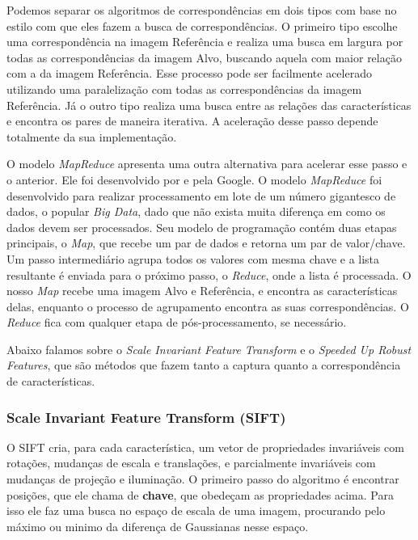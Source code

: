    Podemos separar os algoritmos de correspondências em dois tipos com base no estilo com que eles fazem a busca de 
correspondências. O primeiro tipo escolhe uma correspondência na imagem Referência e realiza uma busca em largura por
todas as correspondências da imagem Alvo, buscando aquela com maior relação com a da imagem Referência. Esse processo
pode ser facilmente acelerado utilizando uma paralelização com todas as correspondências da imagem Referência. Já o 
outro tipo realiza uma busca entre as relações das características e encontra os pares de maneira iterativa. A 
aceleração desse passo depende totalmente da sua implementação.

    O modelo \textit{MapReduce} apresenta uma outra alternativa para acelerar esse passo e o anterior. Ele foi 
desenvolvido por \cite{dean2008mapreduce} e pela Google. O modelo \textit{MapReduce} foi desenvolvido para realizar 
processamento em lote de um número gigantesco de dados, o popular \textit{Big Data}, dado que não exista muita diferença 
em como os dados devem ser processados. Seu modelo de programação contém duas etapas principais, o \textit{Map}, que 
recebe um par de dados e retorna um par de valor/chave. Um passo intermediário agrupa todos os valores com mesma chave e
a lista resultante é enviada para o próximo passo, o \textit{Reduce}, onde a lista é processada. O nosso \textit{Map} 
recebe uma imagem Alvo e Referência, e encontra as características delas, enquanto o processo de agrupamento encontra as
suas correspondências. O \textit{Reduce} fica com qualquer etapa de pós-processamento, se necessário.

  Abaixo falamos sobre o \textit{Scale Invariant Feature Transform} e o \textit{Speeded Up Robust Features}, que são
métodos que fazem tanto a captura quanto a correspondência de características.

\subsubsection{Scale Invariant Feature Transform (SIFT)}
  O SIFT cria, para cada característica, um vetor de propriedades invariáveis com rotações, mudanças de escala e 
translações, e parcialmente invariáveis com mudanças de projeção e iluminação. O primeiro passo do algoritmo é encontrar
posições, que ele chama de \textbf{chave}, que obedeçam as propriedades acima. Para isso ele faz uma busca no espaço
de escala de uma imagem, procurando pelo máximo ou minimo da diferença de Gaussianas nesse espaço.


